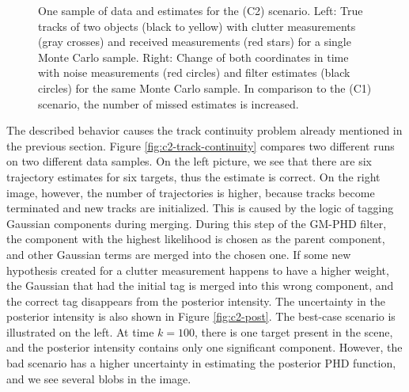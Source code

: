 \begin{figure}
\begin{subfigure}[]{0.48\linewidth}
\begin{subfigure}[b]{\linewidth}
        \end{subfigure}
    \end{subfigure}
  \caption[One sample of data and estimates for the (C2) scenario.]{One sample of data and estimates for the (C2) scenario. Left: True tracks of two objects (black to yellow) with clutter measurements (gray crosses) and received measurements (red stars) for a single Monte Carlo sample. Right: Change of both coordinates in time with noise measurements (red circles) and filter estimates (black circles) for the same Monte Carlo sample. In comparison to the (C1) scenario, the number of missed estimates is increased.}
  \label{fig:c2-results-overview}
\end{figure}

The described behavior causes the track continuity problem already mentioned in the previous section. Figure \ref{fig:c2-track-continuity} compares two different runs on two different data samples. On the left picture, we see that there are six trajectory estimates for six targets, thus the estimate is correct. On the right image, however, the number of trajectories is higher, because tracks become terminated and new tracks are initialized. This is caused by the logic of tagging Gaussian components during merging. During this step of the GM-PHD filter, the component with the highest likelihood is chosen as the parent component, and other Gaussian terms are merged into the chosen one. If some new hypothesis created for a clutter measurement happens to have a higher weight, the Gaussian that had the initial tag is merged into this wrong component, and the correct tag disappears from the posterior intensity. The uncertainty in the posterior intensity is also shown in Figure \ref{fig:c2-post}. The best-case scenario is illustrated on the left. At time $k=100$, there is one target present in the scene, and the posterior intensity contains only one significant component. However, the bad scenario has a higher uncertainty in estimating the posterior PHD function, and we see several blobs in the image.

